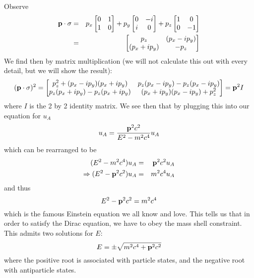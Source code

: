 Observe
\begin{eqnarray*}
\bold{p}\cdot\sigma &=& p_x\begin{bmatrix}
0 & 1\\
1 & 0 
\end{bmatrix}
+ p_{y}\begin{bmatrix}
0 & -i\\
i & 0
\end{bmatrix}
+ p_{z}\begin{bmatrix}
1 & 0 \\
0 & -1
\end{bmatrix} \\
&=& \begin{bmatrix}
p_{z} & (p_{x} - ip_{y}) \\
(p_{x} + ip_{y}) & -p_{z}
\end{bmatrix}
\end{eqnarray*}
We find then by matrix multiplication (we will not calculate this out with every
detail, but we will show the result):
\begin{equation}
(\bold{p}\cdot\sigma)^2 = \begin{bmatrix} p_{z}^2 + (p_x - ip_{y})(p_{x} + ip_{y}) & p_{z}(p_{x} - ip_{y}) - p_{z}(p_{x} - ip_{y}) \\
p_{z}(p_{x} + ip_{y}) - p_{z}(p_{x} + ip_{y}) & (p_{x} + ip_{y})(p_{x} - ip_{y}) + p_{z}^2
\end{bmatrix} = \bold{p}^2 I
\end{equation}
where $I$ is the 2 by 2 identity matrix. We see then that by plugging this into our equation for $u_A$
\begin{equation}
u_A = \frac{\bold{p}^2c^2}{E^2 - m^2c^4}u_A
\end{equation}
which can be rearranged to be
\begin{eqnarray*}
(E^2 - m^2c^4)u_A &=& \bold{p}^2c^2 u_A \\
\Rightarrow (E^2 - \bold{p}^2c^2)u_A &=& m^2c^4 u_A
\end{eqnarray*}
and thus
\begin{equation}
E^2 - \bold{p}^2c^2 = m^2c^4
\end{equation}
which is the famous Einstein equation we all know and love. This tells us that
in order to satisfy the Dirac equation, we have to obey the mass shell constraint.
This admits two solutions for $E$:
\begin{equation}
E = \pm\sqrt{m^2 c^4 + \bold{p}^2c^2}
\end{equation}
where the positive root is associated with particle states, and the negative
root with antiparticle states.


